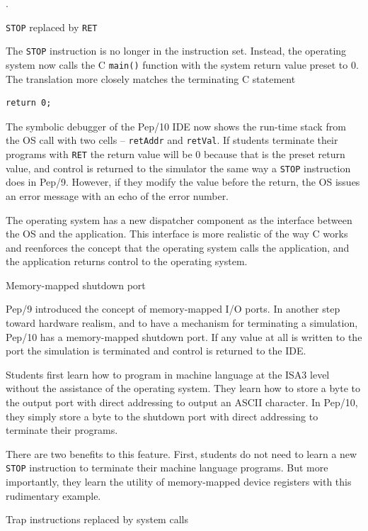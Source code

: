 \documentclass[10pt,fleqn]{book}
\newenvironment{exercises}
   {\begin{list}
      {\arabic{ecounter}.}
      {
         \usecounter{ecounter}
         \setcounter {ecounter}{0}
         \setlength\leftmargin{2pc}
         \setlength\labelwidth{6pc}
         \setlength\labelsep{1pc}
      }}
   {\end{list}}
\newcounter{ecounter}
\begin{document}
\begin{exercises}
\item \verb|STOP| replaced by \verb|RET|

The \verb|STOP| instruction is no longer in the instruction set.
Instead, the operating system now calls the C \verb|main()| function with the system return value preset to 0.
The translation more closely matches the terminating C statement
\begin{verbatim}
return 0;
\end{verbatim}
The symbolic debugger of the Pep/10 IDE now shows the run-time stack from the OS call with two cells -- \verb|retAddr| and \verb|retVal|.
If students terminate their programs with \verb|RET| the return value will be 0 because that is the preset return value, and control is returned to the simulator the same way a \verb|STOP| instruction does in Pep/9.
However, if they modify the value before the return, the OS issues an error message with an echo of the error number.

The operating system has a new dispatcher component as the interface between the OS and the application.
This interface is more realistic of the way C works and reenforces the concept that the operating system calls the application, and the application returns control to the operating system.

\item Memory-mapped shutdown port

Pep/9 introduced the concept of memory-mapped I/O ports.
In another step toward hardware realism, and to have a mechanism for terminating a simulation, Pep/10 has a memory-mapped shutdown port.
If any value at all is written to the port the simulation is terminated and control is returned to the IDE.

Students first learn how to program in machine language at the ISA3 level without the assistance of the operating system.
They learn how to store a byte to the output port with direct addressing to output an ASCII character.
In Pep/10, they simply store a byte to the shutdown port with direct addressing to terminate their programs.

There are two benefits to this feature.
First, students do not need to learn a new \verb|STOP| instruction to terminate their machine language programs.
But more importantly, they learn the utility of memory-mapped device registers with this rudimentary example.

\item Trap instructions replaced by system calls


\end{exercises}
\end{document}

